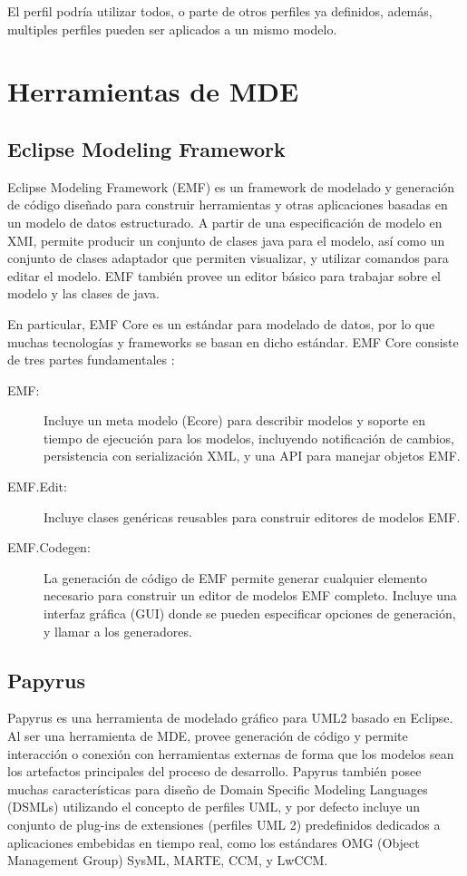 El perfil podría utilizar todos, o parte de otros perfiles ya definidos, además, multiples perfiles pueden ser aplicados a un mismo modelo.

\section{Herramientas de MDE}
\subsection{Eclipse Modeling Framework}
Eclipse Modeling Framework (EMF) es un framework de modelado y generación de código diseñado para construir herramientas y otras aplicaciones basadas en un modelo de datos estructurado.  
A partir de una especificación de modelo en XMI, permite producir un conjunto de clases java para el modelo, así como un conjunto de clases adaptador que permiten visualizar, y utilizar comandos para editar el modelo. EMF también provee un editor básico para trabajar sobre el modelo y las clases de java.

En particular, EMF Core es un estándar para modelado de datos, por lo que muchas tecnologías y frameworks se basan en dicho estándar. 
EMF Core consiste de tres partes fundamentales \cite{steinberg2008emf}:
\begin{description}
\item[EMF:] Incluye un meta modelo (Ecore) para describir modelos y soporte en tiempo de ejecución para los modelos, incluyendo notificación de cambios, persistencia con serialización XML, y una API para manejar objetos EMF.

\item[EMF.Edit:] Incluye clases genéricas reusables para construir editores de modelos EMF.

\item[EMF.Codegen:] La generación de código de EMF permite generar cualquier elemento necesario para construir un editor de modelos EMF completo. Incluye una interfaz gráfica (GUI) donde se pueden especificar opciones de generación, y llamar a los generadores.
\end{description}

\subsection{Papyrus}
Papyrus es una herramienta de modelado gráfico para UML2 basado en Eclipse. Al ser una herramienta de MDE, provee generación de código y permite interacción o conexión con herramientas externas de forma que los modelos sean los artefactos principales del proceso de desarrollo.
Papyrus también posee muchas características para diseño de Domain Specific Modeling Languages (DSMLs) utilizando el concepto de perfiles UML, y por defecto incluye un conjunto de plug-ins de extensiones (perfiles UML 2) predefinidos dedicados a aplicaciones embebidas en tiempo real, como los estándares OMG (Object Management Group) SysML, MARTE, CCM, y LwCCM.

